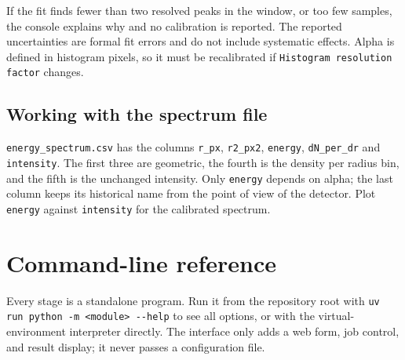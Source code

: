 \documentclass[11pt,a4paper]{article}
\newcommand{\code}[1]{\texttt{#1}}
\begin{document}
If the fit finds fewer than two resolved peaks in the window, or too few
samples, the console explains why and no calibration is reported. The
reported uncertainties are formal fit errors and do not include systematic
effects. Alpha is defined in histogram pixels, so it must be recalibrated if
\code{Histogram resolution factor} changes.

\subsection{Working with the spectrum file}

\code{energy\_\allowbreak{}spectrum.csv} has the columns
\code{r\_\allowbreak{}px}, \code{r2\_\allowbreak{}px2}, \code{energy}, \code{dN\_\allowbreak{}per\_\allowbreak{}dr} and
\code{intensity}. The first three are geometric, the fourth is the density
per radius bin, and the fifth is the unchanged intensity. Only
\code{energy} depends on alpha; the last column keeps its historical name
from the point of view of the detector. Plot \code{energy} against
\code{intensity} for the calibrated spectrum.

\section{Command-line reference}
\label{sec:cli}

Every stage is a standalone program. Run it from the repository root with
\code{uv run python -\allowbreak{}m <module> -\allowbreak{}-\allowbreak{}help} to see all options, or with the
virtual-environment interpreter directly. The interface only adds a web form,
job control, and result display; it never passes a configuration file.
\end{document}
